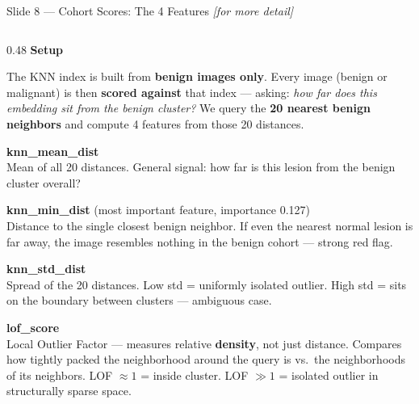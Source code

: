 \documentclass[aspectratio=169, 9pt]{beamer}
\begin{document}
\begin{frame}{Slide 8 --- Cohort Scores: The 4 Features \hfill{\small\textit{[for more detail]}}}

  \begin{columns}[T]

    \begin{column}{0.48\textwidth}
      \textbf{\color{navyblue}Setup}

      \vspace{0.2em}
      {\scriptsize
      The KNN index is built from \textbf{benign images only}.
      Every image (benign or malignant) is then \textbf{scored against} that
      index --- asking: \textit{how far does this embedding sit from the
      benign cluster?} We query the \textbf{20 nearest benign neighbors}
      and compute 4 features from those 20 distances.
      }

      \vspace{0.35em}
      \textbf{\color{orange}knn\_mean\_dist}\\
      {\scriptsize Mean of all 20 distances. General signal: how far is this
      lesion from the benign cluster overall?}

      \vspace{0.25em}
      \textbf{\color{darkred}knn\_min\_dist} {\scriptsize\color{gray}(most important feature, importance 0.127)}\\
      {\scriptsize Distance to the single closest benign neighbor.
      If even the nearest normal lesion is far away, the image
      resembles nothing in the benign cohort --- strong red flag.}

      \vspace{0.25em}
      \textbf{\color{purple}knn\_std\_dist}\\
      {\scriptsize Spread of the 20 distances. Low std = uniformly
      isolated outlier. High std = sits on the boundary between clusters
      --- ambiguous case.}

      \vspace{0.25em}
      \textbf{\color{teal}lof\_score}\\
      {\scriptsize Local Outlier Factor --- measures relative \textbf{density},
      not just distance. Compares how tightly packed the neighborhood
      around the query is vs.\ the neighborhoods of its neighbors.
      LOF $\approx 1$ = inside cluster. LOF $\gg 1$ = isolated outlier
      in structurally sparse space.}
    \end{column}


\end{columns}
\end{frame}
\end{document}
